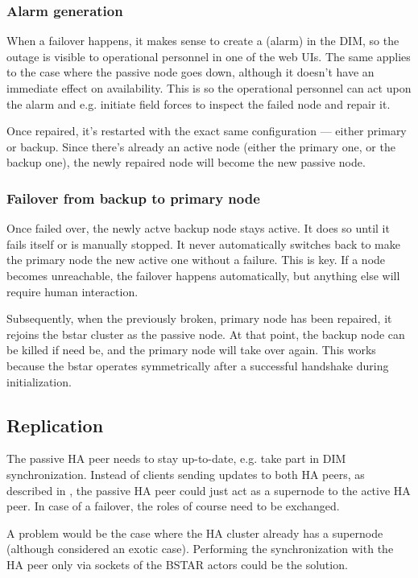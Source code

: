 \subsubsection{Alarm generation}
When a failover happens, it makes sense to create a  (alarm) in the
DIM, so the outage is visible to operational personnel in one of the web UIs.
The same applies to the case where the passive node goes down, although it
doesn't have an immediate effect on availability.  This is so the operational
personnel can act upon the alarm and e.g. initiate field forces to inspect the
failed node and repair it.

Once repaired, it's restarted with the exact same configuration --- either primary
or backup. Since there's already an active node (either the primary one,
or the backup one), the newly repaired node will become the new passive node.

\subsubsection{Failover from backup to primary node}
Once failed over, the newly actve backup node stays active. It does so until it
fails itself or is manually stopped. It never automatically switches back to
make the primary node the new active one without a failure. This is key. If a
node becomes unreachable, the failover happens automatically, but anything else will
require human interaction.

Subsequently, when the previously broken, primary node has been repaired, it
rejoins the \gls{bstar} cluster as the passive node. At that point, the backup
node can be killed if need be, and the primary node will take over again.  This
works because the \gls{bstar} operates symmetrically after a successful
handshake during initialization.

\subsection{Replication}
The passive HA peer needs to stay up-to-date, e.g. take part in DIM
synchronization. Instead of clients sending updates to both HA peers, as
described in \cite[Chapter 5 - Advanced Pub-Sub Patterns, The Clustered Hashmap
Protocol]{zmq:zguide}, the passive HA peer could just act as a supernode to the
active HA peer. In case of a failover, the roles of course need to be
exchanged.

A problem would be the case where the HA cluster already has a supernode
(although considered an exotic case). Performing the synchronization with the
HA peer only via sockets of the BSTAR actors could be the solution.


